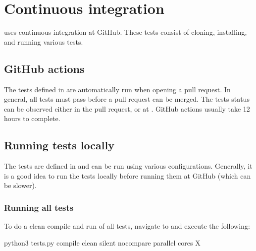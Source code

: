 \documentclass[letterpaper,10pt,english]{sphinxmanual}
\begin{document}
\section{Continuous integration}
\label{\detokenize{Contrib/CI:continuous-integration}}\label{\detokenize{Contrib/CI:chap-ci}}\label{\detokenize{Contrib/CI::doc}}
\sphinxAtStartPar
{} uses continuous integration at GitHub.
These tests consist of cloning, installing, and running various  tests.


\subsection{GitHub actions}
\label{\detokenize{Contrib/CI:github-actions}}
\sphinxAtStartPar
The tests defined in  are automatically run when opening a pull request.
In general, all tests must pass before a pull request can be merged.
The tests status can be observed either in the pull request, or at .
GitHub actions usually take 1\sphinxhyphen{}2 hours to complete.


\subsection{Running tests locally}
\label{\detokenize{Contrib/CI:running-tests-locally}}
\sphinxAtStartPar
The tests are defined in  and can be run using various configurations.
Generally, it is a good idea to run the tests locally before running them at GitHub (which can be slower).


\subsubsection{Running all tests}
\label{\detokenize{Contrib/CI:running-all-tests}}
\sphinxAtStartPar
To do a clean compile and run of all tests, navigate to  and execute the following:

\begin{sphinxVerbatim}[commandchars=\\\{\},formatcom=\scriptsize]
python3 tests.py \PYGZhy{}\PYGZhy{}compile \PYGZhy{}\PYGZhy{}clean \PYGZhy{}\PYGZhy{}silent \PYGZhy{}\PYGZhy{}no\PYGZus{}compare \PYGZhy{}\PYGZhy{}parallel \PYGZhy{}cores X
\end{sphinxVerbatim}
\end{document}
